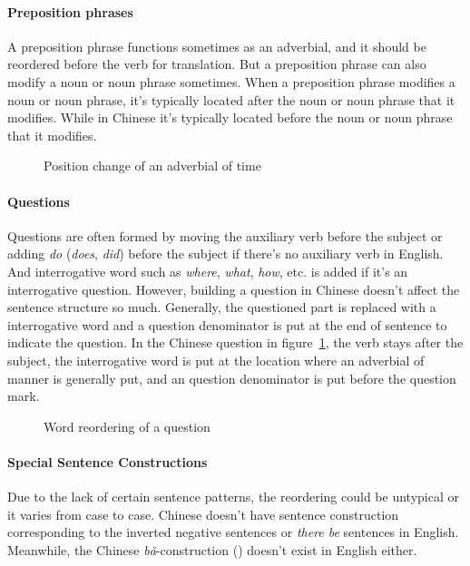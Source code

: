 \paragraph{Preposition phrases}
A preposition phrase functions sometimes as an adverbial, and it should be reordered before the verb for translation. But a preposition phrase can also modify a noun or noun phrase sometimes. When a preposition phrase modifies a noun or noun phrase, it's typically located after the noun or noun phrase that it modifies. While in Chinese it's typically located before the noun or noun phrase that it modifies.

\begin{figure}[H]
\centering

\caption{Position change of an adverbial of time}
\end{figure}

\paragraph{Questions}
Questions are often formed by moving the auxiliary verb before the subject or adding \emph{do} (\emph{does}, \emph{did}) before the subject if there's no auxiliary verb in English. And interrogative word such as \emph{where}, \emph{what}, \emph{how}, etc. is added if it's an interrogative question. However, building a question in Chinese doesn't affect the sentence structure so much. Generally, the questioned part is replaced with a interrogative word and a question denominator is put at the end of sentence to indicate the question. In the Chinese question in figure~\ref{question}, the verb stays after the subject, the interrogative word is put at the location where an adverbial of manner is generally put, and an question denominator is put before the question mark.

\begin{figure}[H]
\centering

\caption{Word reordering of a question}
\label{question}
\end{figure}

\paragraph{Special Sentence Constructions}
Due to the lack of certain sentence patterns, the reordering could be untypical or it varies from case to case. Chinese doesn't have sentence construction corresponding to the inverted negative sentences or \emph{there be} sentences in English. Meanwhile, the Chinese \linebreak\emph{bǎ}-construction () doesn't exist in English either.


